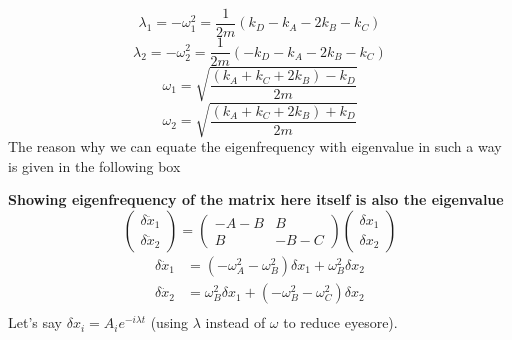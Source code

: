 \documentclass[letter]{article}
\begin{document}
\[
\boxed{
\lambda_1 = -  \omega^2_1 =  \frac{1}{2m} \left(k_D - k_A - 2k_B - k_C \right)
}
\] 
\[
\boxed{
\lambda_2 = - \omega_2^2 = \frac{1}{2m} \left(- k_D - k_A - 2k_B - k_C \right)
}
\] 
\[
\omega_1 = \sqrt{\frac{(k_A + k_C + 2k_B ) - k_D }{ 2m }} 
\] 
\[
\omega_2 = \sqrt{\frac{(k_A + k_C + 2k_B ) + k_D }{ 2m }} 
\] 
The reason why we can equate the eigenfrequency with eigenvalue in such a way is given in the following box 

\begin{tcolorbox}[sharpish corners, colframe=black]
\textbf{Showing eigenfrequency of the matrix here itself is also the eigenvalue}	
\[
\begin{pmatrix} \delta \ddot x_1 \\ \delta \ddot x_2 \end{pmatrix}  = 
\begin{pmatrix}  -A-B  & B \\
	B & -B - C  
\end{pmatrix}
\begin{pmatrix} \delta x_1 \\ \delta x_2 \end{pmatrix} 
\]
 \begin{align*}
	 \delta \ddot x_1 &= (-\omega^2_A - \omega^2_B ) \delta x_1 + \omega_B^2 \delta x_2  \\
	 \delta \ddot x_2 &= \omega^2_B  \delta x_1 + (- \omega_B^2 - \omega_C^2 ) \delta x_2 \\
 \end{align*}
 Let's say $\delta x_i = A_i e^{- i \lambda t}$ (using $\lambda$ instead of $ \omega$ to reduce eyesore). 


\end{tcolorbox}
\end{document}
